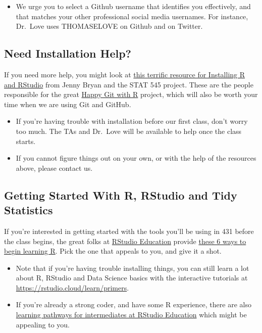 \documentclass[
]{book}
\providecommand{\tightlist}{%
  \setlength{\itemsep}{0pt}\setlength{\parskip}{0pt}}
\begin{document}
\begin{enumerate}
  \begin{itemize}
  \tightlist
  \item
    We urge you to select a Github username that identifies you effectively, and that matches your other professional social media usernames. For instance, Dr.~Love uses THOMASELOVE on Github and \citet{ThomasELove} on Twitter.
  \end{itemize}
\end{enumerate}

\hypertarget{need-installation-help}{%
\subsection{Need Installation Help?}\label{need-installation-help}}

If you need more help, you might look at \href{https://stat545.com/install.html}{this terrific resource for Installing R and RStudio} from Jenny Bryan and the STAT 545 project. These are the people responsible for the great \href{http://happygitwithr.com/}{Happy Git with R} project, which will also be worth your time when we are using Git and GitHub.

\begin{itemize}
\item
  If you're having trouble with installation before our first class, don't worry too much. The TAs and Dr.~Love will be available to help once the class starts.
\item
  If you cannot figure things out on your own, or with the help of the resources above, please contact us.
\end{itemize}

\hypertarget{getting-started-with-r-rstudio-and-tidy-statistics}{%
\subsection{Getting Started With R, RStudio and Tidy Statistics}\label{getting-started-with-r-rstudio-and-tidy-statistics}}

If you're interested in getting started with the tools you'll be using in 431 before the class begins, the great folks at \href{https://education.rstudio.com/learn/beginner/}{RStudio Education} provide \href{https://education.rstudio.com/learn/beginner/}{these 6 ways to begin learning R}. Pick the one that appeals to you, and give it a shot.

\begin{itemize}
\tightlist
\item
  Note that if you're having trouble installing things, you can still learn a lot about R, RStudio and Data Science basics with the interactive tutorials at \url{https://rstudio.cloud/learn/primers}.
\item
  If you're already a strong coder, and have some R experience, there are also \href{https://education.rstudio.com/learn/intermediate/}{learning pathways for intermediates at RStudio Education} which might be appealing to you.
\end{itemize}
\end{document}
